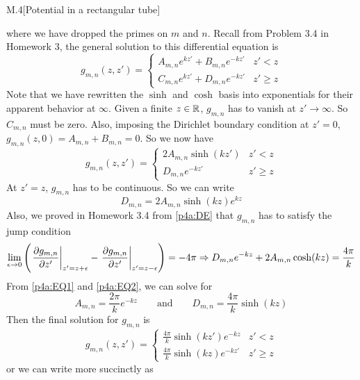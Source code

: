 \documentclass[12pt]{article}
\begin{document}
\begin{problem}{M.4}[Potential in a rectangular tube]
\begin{solution}
where we have dropped the primes on $m$ and $n$. Recall from Problem 3.4 in
Homework 3, the general solution to this differential equation is
\begin{equation}
    g_{m,n}(z,z')=\begin{cases}
        A_{m,n}e^{kz'}+B_{m,n}e^{-kz'} & z'<z\\
        C_{m,n}e^{kz'}+D_{m,n}e^{-kz'} & z'\geq z
    \end{cases}
\end{equation}
Note that we have rewritten the $\sinh$ and $\cosh$ basis into exponentials for
their apparent behavior at $\infty$. Given a finite $z\in\mathbb{R}$, $g_{m,n}$ has to
vanish at $z'\to\infty$. So $C_{m,n}$ must be zero. Also, imposing the Dirichlet
boundary condition at $z'=0$, $g_{m,n}(z,0)=A_{m,n}+B_{m,n}=0$. So we now have
\begin{equation}
    g_{m,n}(z,z')=\begin{cases}
        2A_{m,n}\sinh(kz') & z'<z\\
        D_{m,n}e^{-kz'} & z'\geq z
    \end{cases}
\end{equation}
At $z'=z$, $g_{m,n}$ has to be continuous. So we can write
\begin{equation}\label{p4a:EQ1}
    D_{m,n}=2A_{m,n}\sinh(kz)e^{kz} 
\end{equation}
Also, we proved in Homework 3.4 from \eqref{p4a:DE} that $g_{m,n}$ has to 
satisfy the jump condition
\begin{equation}\label{p4a:EQ2}
    \lim_{\epsilon\to0}\qty(
    \eval{\frac{\partial g_{m,n}}{\partial z'}}_{z'=z+\epsilon}
    -\eval{\frac{\partial g_{m,n}}{\partial z'}}_{z'=z-\epsilon}
    )=-4\pi
    \Rightarrow D_{m,n}e^{-kz}+2A_{m,n}\cosh(kz)=\frac{4\pi}{k}
\end{equation}
From \eqref{p4a:EQ1} and \eqref{p4a:EQ2}, we can solve for
\begin{equation}
    A_{m,n}=\frac{2\pi}{k}e^{-kz}
    \qquad\text{and}\qquad
    D_{m,n}=\frac{4\pi}{k}\sinh(kz)
\end{equation}
Then the final solution for $g_{m,n}$ is
\begin{equation}\label{p4a:g_1}
    g_{m,n}(z,z')=\begin{cases}
        \frac{4\pi}{k}\sinh(kz')e^{-kz} & z'<z\\
        \frac{4\pi}{k}\sinh(kz)e^{-kz'} & z'\geq z
    \end{cases}
\end{equation}
or we can write more succinctly as

\end{solution}
\end{problem}
\end{document}
